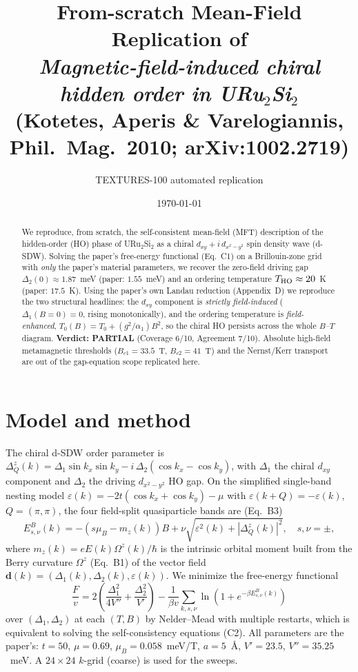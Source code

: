 \documentclass[11pt]{article}
\title{From-scratch Mean-Field Replication of\\
\emph{Magnetic-field-induced chiral hidden order in URu$_2$Si$_2$}\\
(Kotetes, Aperis \& Varelogiannis, Phil.\ Mag.\ 2010; arXiv:1002.2719)}
\author{TEXTURES-100 automated replication}
\date{\today}
\begin{document}
\maketitle

\begin{abstract}
We reproduce, from scratch, the self-consistent mean-field (MFT) description of the
hidden-order (HO) phase of URu$_2$Si$_2$ as a chiral $d_{xy}+i\,d_{x^2-y^2}$ spin
density wave (d-SDW). Solving the paper's free-energy functional (Eq.~C1) on a
Brillouin-zone grid with \emph{only} the paper's material parameters, we recover the
zero-field driving gap $\Delta_2(0)\approx1.87$~meV (paper: $1.55$~meV) and an
ordering temperature $T_{\rm HO}\approx20$~K (paper: $17.5$~K). Using the paper's own
Landau reduction (Appendix~D) we reproduce the two structural headlines: the $d_{xy}$
component is \emph{strictly field-induced} ($\Delta_1(B{=}0)=0$, rising monotonically),
and the ordering temperature is \emph{field-enhanced}, $T_0(B)=T_0+(g^2/\alpha_1)B^2$,
so the chiral HO persists across the whole $B$--$T$ diagram. \textbf{Verdict: PARTIAL}
(Coverage 6/10, Agreement 7/10). Absolute high-field metamagnetic thresholds
($B_{c1}=33.5$~T, $B_{c2}=41$~T) and the Nernst/Kerr transport are out of the
gap-equation scope replicated here.
\end{abstract}

\section{Model and method}
The chiral d-SDW order parameter is
$\Delta^z_Q(k)=\Delta_1\sin k_x\sin k_y - i\,\Delta_2(\cos k_x-\cos k_y)$,
with $\Delta_1$ the chiral $d_{xy}$ component and $\Delta_2$ the driving
$d_{x^2-y^2}$ HO gap. On the simplified single-band nesting model
$\varepsilon(k)=-2t(\cos k_x+\cos k_y)-\mu$ with $\varepsilon(k+Q)=-\varepsilon(k)$,
$Q=(\pi,\pi)$, the four field-split quasiparticle bands are (Eq.~B3)
\begin{equation}
E^B_{s,\nu}(k)=-(s\mu_B-m_z(k))B+\nu\sqrt{\varepsilon^2(k)+|\Delta^z_Q(k)|^2},\quad s,\nu=\pm,
\end{equation}
where $m_z(k)=eE(k)\Omega^z(k)/\hbar$ is the intrinsic orbital moment built from the
Berry curvature $\Omega^z$ (Eq.~B1) of the vector field
$\mathbf d(k)=(\Delta_1(k),\Delta_2(k),\varepsilon(k))$. We minimize the free-energy
functional
\begin{equation}
\frac{F}{v}=2\!\left(\frac{\Delta_1^2}{4V''}+\frac{\Delta_2^2}{V'}\right)
-\frac{1}{\beta v}\sum_{k,s,\nu}\ln\!\left(1+e^{-\beta E^B_{s,\nu}(k)}\right)
\tag{C1}
\end{equation}
over $(\Delta_1,\Delta_2)$ at each $(T,B)$ by Nelder--Mead with multiple restarts,
which is equivalent to solving the self-consistency equations (C2). All parameters are
the paper's: $t=50$, $\mu=0.69$, $\mu_B=0.058$~meV/T, $a=5$~\AA,
$V'=23.5$, $V''=35.25$~meV. A $24\times24$ $k$-grid (coarse) is used for the sweeps.
\end{document}

